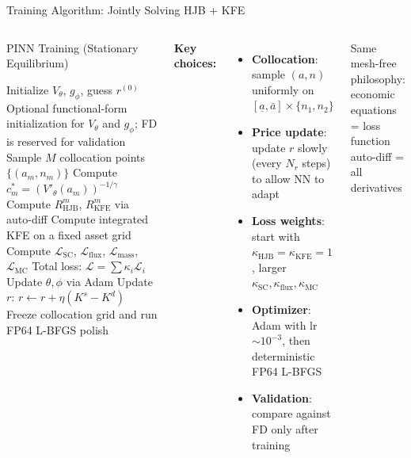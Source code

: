 \documentclass[aspectratio=169,11pt]{beamer}
\newcommand{\emphc}[1]{\textcolor{harvardcrimson}{#1}}
\newcommand{\ubar}[1]{\underline{#1}}
\begin{document}
\begin{frame}[shrink=2]{Training Algorithm: Jointly Solving HJB + KFE}
\begin{columns}[T]
\begin{block}{PINN Training (Stationary Equilibrium)}
\small
\begin{algorithmic}[1]
\STATE Initialize $V_\theta$, $g_\phi$, guess $r^{(0)}$
\STATE Optional functional-form initialization for $V_\theta$ and $g_\phi$; FD is reserved for validation
    \STATE Sample $M$ collocation points $\{(a_m, n_m)\}$
    \STATE Compute $c_m^* = (V'_\theta(a_m))^{-1/\gamma}$
    \STATE Compute $R_{\text{HJB}}^m$, $R_{\text{KFE}}^m$ via auto-diff
    \STATE Compute integrated KFE on a fixed asset grid
    \STATE Compute $\mathcal{L}_{\text{SC}}$, $\mathcal{L}_{\text{flux}}$, $\mathcal{L}_{\text{mass}}$, $\mathcal{L}_{\text{MC}}$
    \STATE Total loss: $\mathcal{L} = \sum \kappa_i \mathcal{L}_i$
    \STATE Update $\theta, \phi$ via Adam
        \STATE Update $r$: $r \leftarrow r + \eta(K^s - K^d)$
	    \ENDIF
\ENDFOR
\STATE Freeze collocation grid and run FP64 L-BFGS polish
\end{algorithmic}
\end{block}

\small
\textbf{Key choices:}
\begin{itemize}\itemsep1pt
    \item \textbf{Collocation}: sample $(a,n)$ uniformly on $[\ubar{a}, \bar{a}] \times \{n_1, n_2\}$
    \item \textbf{Price update}: update $r$ slowly (every $N_r$ steps) to allow NN to adapt
    \item \textbf{Loss weights}: start with $\kappa_{\text{HJB}}=\kappa_{\text{KFE}}=1$, larger $\kappa_{\text{SC}},\kappa_{\text{flux}},\kappa_{\text{MC}}$
    \item \textbf{Optimizer}: Adam with lr $\sim 10^{-3}$, then deterministic FP64 L-BFGS
    \item \textbf{Validation}: compare against FD only after training
\end{itemize}

\vspace{0.2em}
\begin{center}
\colorbox{uzhgreylight}{\parbox{0.9\columnwidth}{\centering\small
Same mesh-free philosophy:\\
\emphc{economic equations = loss function}\\
\emphc{auto-diff = all derivatives}}}
\end{center}
\end{columns}
\end{frame}
\end{document}
